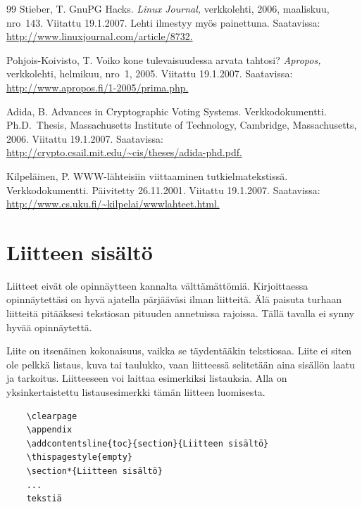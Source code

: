 \documentclass[finnish, 12pt, a4paper, arts, utf8, a-2b, online]{aaltothesis}
\begin{document}
\begin{thebibliography}{99}
 Stieber, T. GnuPG Hacks. \textit{Linux Journal,}
   verkkolehti, 2006, maaliskuu, nro~143. Viitattu 19.1.2007. Lehti ilmestyy
   myös painettuna. Saatavissa: \url{http://www.linuxjournal.com/article/8732.}

 Pohjois-Koivisto, T. Voiko kone tulevaisuudessa arvata tahtosi? 
   \textit{Apropos,} verkkolehti, helmikuu, nro~1, 2005. Viitattu 19.1.2007. 
Saatavissa: \url{http://www.apropos.fi/1-2005/prima.php.}

 Adida, B. \foreignlanguage{english}{Advances in Cryptographic 
	Voting Systems.} Verkkodokumentti. 
	\foreignlanguage{english}{Ph.D.\ Thesis, Massachusetts Institute of	
		Technology, Cambridge, Massachusetts,} 2006. Viitattu 19.1.2007. 
	Saatavissa:
	\url{http://crypto.csail.mit.edu/~cis/theses/adida-phd.pdf.}

 Kilpeläinen, P. WWW-lähteisiin viittaaminen 
   tutkielmatekstissä. Verkkodokumentti. Päivitetty 26.11.2001.
   Viitattu 19.1.2007. Saatavissa:
   \url{http://www.cs.uku.fi/~kilpelai/wwwlahteet.html.}

\end{thebibliography}


\clearpage
\thesisappendix

\section{Liitteen sisältö}
\label{liite:sisalto}

Liitteet eivät ole opinnäytteen kannalta välttämättömiä. Kirjoittaessa 
opinnäytettäsi on hyvä ajatella pärjääväsi ilman liitteitä. Älä paisuta turhaan 
liitteitä pitääksesi tekstiosan pituuden annetuissa rajoissa. Tällä tavalla ei 
synny hyvää opinnäytettä.   

Liite on itsenäinen kokonaisuus, vaikka se täydentääkin tekstiosaa. Liite ei 
siten ole pelkkä listaus, kuva tai taulukko, vaan liitteessä selitetään aina 
sisällön laatu ja tarkoitus. Liitteeseen voi laittaa esimerkiksi listauksia. 
Alla on yksinkertaistettu listausesimerkki tämän liitteen luomisesta. 
\begin{verbatim}
	\clearpage
	\appendix
	\addcontentsline{toc}{section}{Liitteen sisältö}
	\thispagestyle{empty}
	\section*{Liitteen sisältö}
	...
	tekstiä
\end{verbatim}
\end{document}
